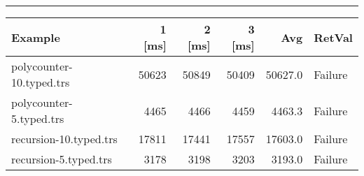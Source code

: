 \documentclass[11pt]{article}
\begin{document}
\rule{\linewidth}{0.5pt}

\begin{center}
\begin{tabular}{lrrrrl}
Example & 1 [ms] & 2 [ms] & 3 [ms] & Avg & RetVal\\
\hline
polycounter-10.typed.trs & 50623 & 50849 & 50409 & 50627.0 & Failure\\
polycounter-5.typed.trs & 4465 & 4466 & 4459 & 4463.3 & Failure\\
recursion-10.typed.trs & 17811 & 17441 & 17557 & 17603.0 & Failure\\
recursion-5.typed.trs & 3178 & 3198 & 3203 & 3193.0 & Failure\\
\end{tabular}

\end{center}
\end{document}
